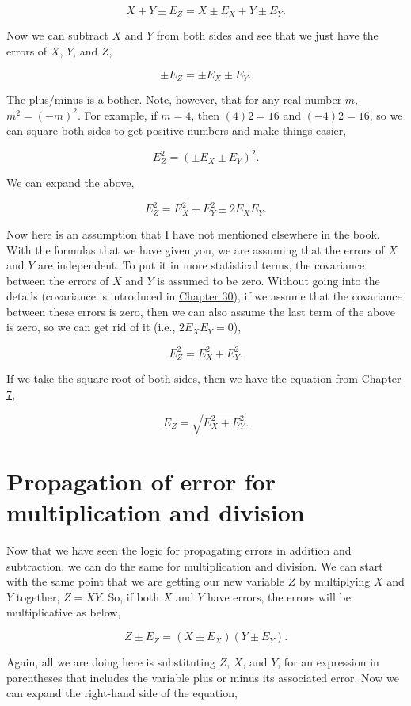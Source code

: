 \documentclass[
  openany]{krantz}
\begin{document}
\[X + Y \pm E_Z = X  \pm E_X + Y \pm E_Y.\]

Now we can subtract \(X\) and \(Y\) from both sides and see that we just have the errors of \(X\), \(Y\), and \(Z\),

\[\pm E_Z = \pm E_X \pm E_Y.\]

The plus/minus is a bother. Note, however, that for any real number \(m\), \(m^{2} = (-m)^2\). For example, if \(m = 4\), then \((4)2 = 16\) and \((-4)2 = 16\), so we can square both sides to get positive numbers and make things easier,

\[E_Z^2 = (\pm E_X \pm E_Y)^2.\]

We can expand the above,

\[E_Z^2 = E_X^2 + E_Y^2 \pm2E_X E_Y.\]

Now here is an assumption that I have not mentioned elsewhere in the book.
With the formulas that we have given you, we are assuming that the errors of \(X\) and \(Y\) are independent.
To put it in more statistical terms, the covariance between the errors of \(X\) and \(Y\) is assumed to be zero.
Without going into the details (covariance is introduced in \protect\hyperlink{Chapter_30}{Chapter 30}), if we assume that the covariance between these errors is zero, then we can also assume the last term of the above is zero, so we can get rid of it (i.e., \(2E_{X}E_{Y} = 0\)),

\[E_Z^2 = E_X^2 + E_Y^2.\]

If we take the square root of both sides, then we have the equation from \protect\hyperlink{Chapter_7}{Chapter 7},

\[E_Z = \sqrt{E_X^2 + E_Y^2}.\]

\hypertarget{propagation-of-error-for-multiplication-and-division}{%
\section{Propagation of error for multiplication and division}\label{propagation-of-error-for-multiplication-and-division}}

Now that we have seen the logic for propagating errors in addition and subtraction, we can do the same for multiplication and division.
We can start with the same point that we are getting our new variable \(Z\) by multiplying \(X\) and \(Y\) together, \(Z = XY\). So, if both \(X\) and \(Y\) have errors, the errors will be multiplicative as below,

\[Z \pm E_Z = (X \pm E_X)(Y \pm E_Y).\]

Again, all we are doing here is substituting \(Z\), \(X\), and \(Y\), for an expression in parentheses that includes the variable plus or minus its associated error.
Now we can expand the right-hand side of the equation,
\end{document}
